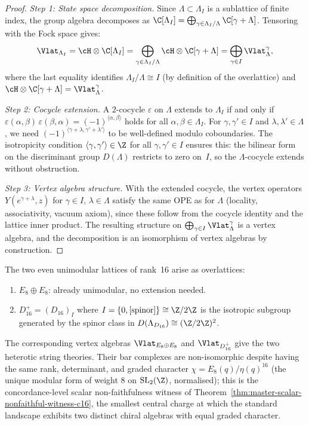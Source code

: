 \begin{proof}
\emph{Step 1: State space decomposition.}
Since $\Lambda \subset \Lambda_I$ is a sublattice of finite index,
the group algebra decomposes as
$\C[\Lambda_I] = \bigoplus_{\gamma \in \Lambda_I/\Lambda} \C[\gamma + \Lambda]$.
Tensoring with the Fock space gives:
\[
\Vlat_{\Lambda_I} = \cH \otimes \C[\Lambda_I]
= \bigoplus_{\gamma \in \Lambda_I/\Lambda} \cH \otimes \C[\gamma + \Lambda]
= \bigoplus_{\gamma \in I} \Vlat_\Lambda^\gamma,
\]
where the last equality identifies $\Lambda_I/\Lambda \cong I$ (by
definition of the overlattice) and
$\cH \otimes \C[\gamma + \Lambda] = \Vlat_\Lambda^\gamma$.

\emph{Step 2: Cocycle extension.}
A $2$-cocycle $\varepsilon$ on $\Lambda$ extends to $\Lambda_I$ if
and only if $\varepsilon(\alpha,\beta)\,\varepsilon(\beta,\alpha) =
(-1)^{\langle\alpha,\beta\rangle}$ holds for all
$\alpha, \beta \in \Lambda_I$. For $\gamma, \gamma' \in I$ and
$\lambda, \lambda' \in \Lambda$, we need
$(-1)^{\langle\gamma+\lambda, \gamma'+\lambda'\rangle}$ to be
well-defined modulo coboundaries. The isotropicity condition
$\langle\gamma, \gamma'\rangle \in \Z$ for all
$\gamma, \gamma' \in I$ ensures this: the bilinear form on the
discriminant group $D(\Lambda)$ restricts to zero on~$I$, so the
$\Lambda$-cocycle extends without obstruction.

\emph{Step 3: Vertex algebra structure.}
With the extended cocycle, the vertex operators
$Y(e^{\gamma+\lambda}, z)$ for $\gamma \in I$, $\lambda \in \Lambda$
satisfy the same OPE as for $\Lambda$ (locality, associativity,
vacuum axiom), since these follow from the cocycle identity and the
lattice inner product. The resulting structure on
$\bigoplus_{\gamma \in I} \Vlat_\Lambda^\gamma$ is a vertex algebra,
and the decomposition is an isomorphism of vertex algebras by
construction.
\end{proof}

\begin{example}\label{ex:lattice:heterotic}
The two even unimodular lattices of rank~16 arise as overlattices:
\begin{enumerate}[label=(\roman*)]
\item $E_8 \oplus E_8$: already unimodular, no extension needed.
\item $D_{16}^+ = (D_{16})_I$ where $I = \{0, [\text{spinor}]\} \cong \Z/2\Z$
 is the isotropic subgroup generated by the spinor class in
 $D(\Lambda_{D_{16}}) \cong (\Z/2\Z)^2$.
\end{enumerate}
The corresponding vertex algebras $\Vlat_{E_8 \oplus E_8}$ and
$\Vlat_{D_{16}^+}$ give the two heterotic string theories. Their bar
complexes are non-isomorphic despite having the same rank,
determinant, and graded character
$\chi = E_8(q)/\eta(q)^{16}$
\textup{(}the unique modular form of weight $8$ on
$\mathrm{SL}_2(\Z)$, normalised\textup{);} this is the
concordance-level scalar non-faithfulness witness of
Theorem~\ref{thm:master-scalar-nonfaithful-witness-c16}, the smallest
central charge at which the standard landscape exhibits two distinct
chiral algebras with equal graded character.
\end{example}

